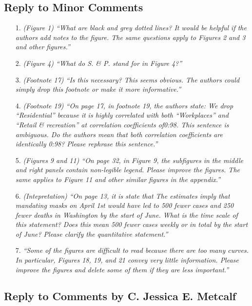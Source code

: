 \documentclass[11pt]{article}
\begin{document}
\subsection*{Reply to Minor Comments}
\begin{itemize}


\item[1.]  \textit{(Figure 1) ``What are black and grey dotted lines? It would be helpful if the authors add notes
to the figure. The same questions apply to Figures 2 and 3 and other figures.''}
\item[2.]  \textit{(Figure 4) ``What do S. \& P. stand for in Figure 4?''}
\item[3.]  \textit{(Footnote 17) ``Is this necessary? This seems obvious. The authors could simply drop this
footnote or make it more informative.''}
\item[4.]  \textit{(Footnote 19) ``On page 17, in footnote 19, the authors state:
We drop “Residential” because it is highly correlated with both “Workplaces” and
“Retail \& recreation” at correlation coefficients of0:98.
This sentence is ambiguous. Do the authors mean that both correlation coefficients are identically 0:98? Please rephrase this sentence.''}
\item[5.]  \textit{(Figures 9 and 11) ``On page 32, in Figure 9, the subfigures in the middle and right panels
contain non-legible legend. Please improve the figures. The same applies to Figure 11 and
other similar figures in the appendix.''}
\item[6. ]  \textit{(Intepretation) ``On page 13, it is state that
The estimates imply that mandating masks on April 1st would have led to 500
fewer cases and 250 fewer deaths in Washington by the start of June.
What is the time scale of this statement? Does this mean 500 fewer cases weekly or in total
by the start of June? Please clarify the quantitative statement.''}
\item[7.]  \textit{``Some of the figures are difficult to read because there are too many curves. In particular,
Figures 18, 19, and 21 convey very little information. Please improve the figures and delete
some of them if they are less important.''}

\end{itemize} 
 
\newpage

\replytitle
\subsection*{Reply to Comments by C. Jessica E. Metcalf }
\end{document}
